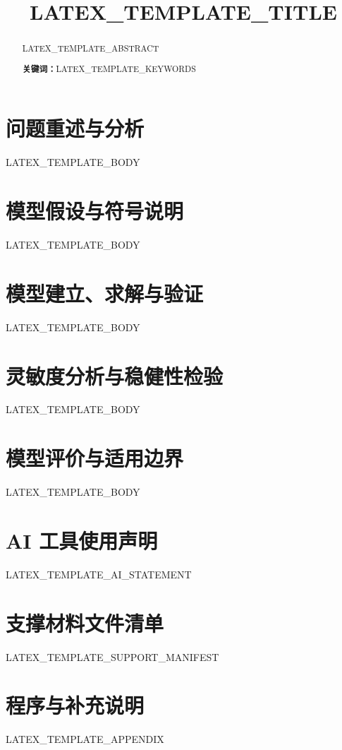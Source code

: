 \documentclass[UTF8,12pt,a4paper]{ctexart}
\title{LATEX_TEMPLATE_TITLE}
\author{}   %
\date{}
\newcommand{\keywords}[1]{\par\noindent\textbf{关键词：}#1}
\begin{document}
\maketitle

\begin{abstract}
LATEX_TEMPLATE_ABSTRACT
\keywords{LATEX_TEMPLATE_KEYWORDS}
\end{abstract}

\section{问题重述与分析}
LATEX_TEMPLATE_BODY

\section{模型假设与符号说明}
LATEX_TEMPLATE_BODY

\section{模型建立、求解与验证}
LATEX_TEMPLATE_BODY

\section{灵敏度分析与稳健性检验}
LATEX_TEMPLATE_BODY

\section{模型评价与适用边界}
LATEX_TEMPLATE_BODY

\section*{AI 工具使用声明}
LATEX_TEMPLATE_AI_STATEMENT




\appendix
\section*{支撑材料文件清单}
LATEX_TEMPLATE_SUPPORT_MANIFEST

\section{程序与补充说明}
LATEX_TEMPLATE_APPENDIX
\end{document}

